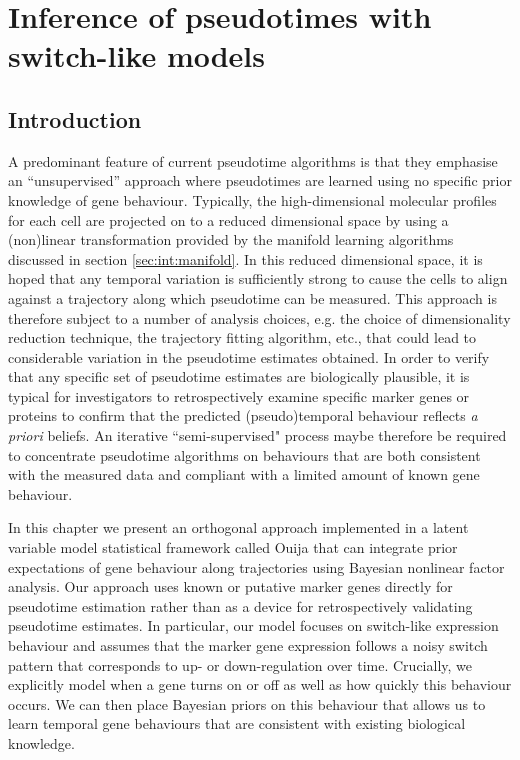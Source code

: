\chapter{Inference of pseudotimes with switch-like models}\label{ch:ouijachap} %

\section{Introduction}

A predominant feature of current pseudotime algorithms is that they  emphasise an ``unsupervised''
 approach where pseudotimes are learned using no specific prior knowledge of gene behaviour. Typically, the high-dimensional molecular profiles for each cell are projected on to a reduced dimensional space by using a (non)linear transformation provided by the manifold learning algorithms discussed in section \ref{sec:int:manifold}. In this reduced dimensional space, it is hoped that any temporal variation is sufficiently strong to cause the cells to align against a trajectory along which pseudotime can be measured. This approach is therefore subject to a number of analysis choices, e.g. the choice of dimensionality reduction technique, the trajectory fitting algorithm, etc., that could lead to considerable variation in the pseudotime estimates obtained. In order to verify that any specific set of pseudotime estimates are biologically plausible, it is typical for investigators to retrospectively examine specific marker genes or proteins to confirm that the predicted (pseudo)temporal behaviour reflects \emph{a priori} beliefs. An iterative ``semi-supervised" process maybe therefore be required to concentrate pseudotime algorithms on behaviours that are both consistent with the measured data and compliant with a limited amount of known gene behaviour.

In this chapter we present an orthogonal approach implemented in a latent variable model statistical framework called Ouija that can integrate prior expectations of gene behaviour along trajectories using Bayesian nonlinear factor analysis. Our approach uses known or putative marker genes directly for pseudotime estimation rather than as a device for retrospectively validating pseudotime estimates. In particular, our model focuses on switch-like expression behaviour and assumes that the marker gene expression follows a noisy switch pattern that corresponds to up- or down-regulation over time. Crucially, we explicitly model when a gene turns on or off as well as how quickly this behaviour occurs. We can then place Bayesian priors on this behaviour that allows us to learn temporal gene behaviours that are consistent with existing biological knowledge.

